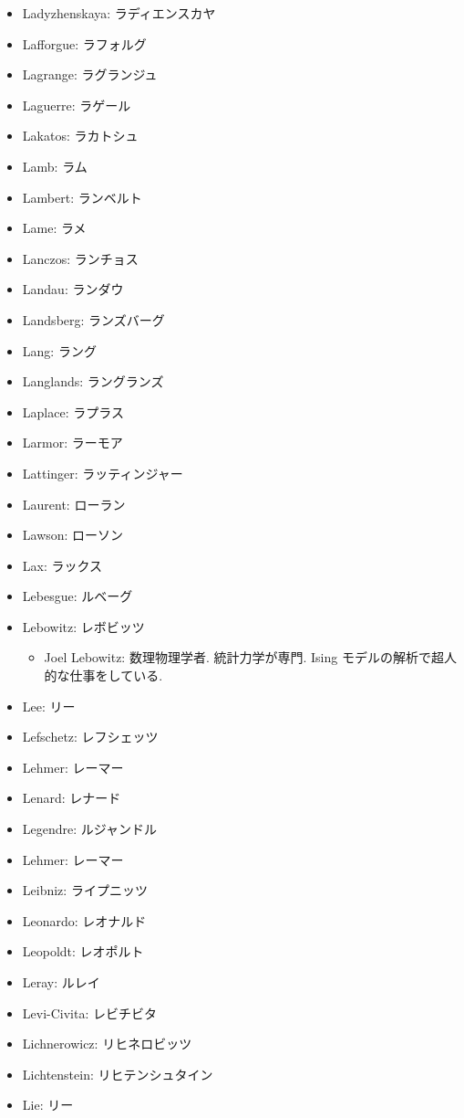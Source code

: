 \documentclass[openany, a4paper, oneside]{jsbook}
\begin{document}
\begin{itemize}
\item Ladyzhenskaya: ラディエンスカヤ
\item Lafforgue: ラフォルグ
\item Lagrange: ラグランジュ
\item Laguerre: ラゲール
\item Lakatos: ラカトシュ
\item Lamb: ラム
\item Lambert: ランベルト
\item Lame: ラメ
\item Lanczos: ランチョス
\item Landau: ランダウ
\item Landsberg: ランズバーグ
\item Lang: ラング
\item Langlands: ラングランズ
\item Laplace: ラプラス
\item Larmor: ラーモア
\item Lattinger: ラッティンジャー
\item Laurent: ローラン
\item Lawson: ローソン
\item Lax: ラックス
\item Lebesgue: ルベーグ
\item Lebowitz: レボビッツ
\begin{itemize}
\item Joel Lebowitz: 数理物理学者. 統計力学が専門. Ising モデルの解析で超人的な仕事をしている.
\end{itemize}
\item Lee: リー
\item Lefschetz: レフシェッツ
\item Lehmer: レーマー
\item Lenard: レナード
\item Legendre: ルジャンドル
\item Lehmer: レーマー
\item Leibniz: ライプニッツ
\item Leonardo: レオナルド
\item Leopoldt: レオポルト
\item Leray: ルレイ
\item Levi-Civita: レビチビタ
\item Lichnerowicz: リヒネロビッツ
\item Lichtenstein: リヒテンシュタイン
\item Lie: リー

\end{itemize}
\end{document}
